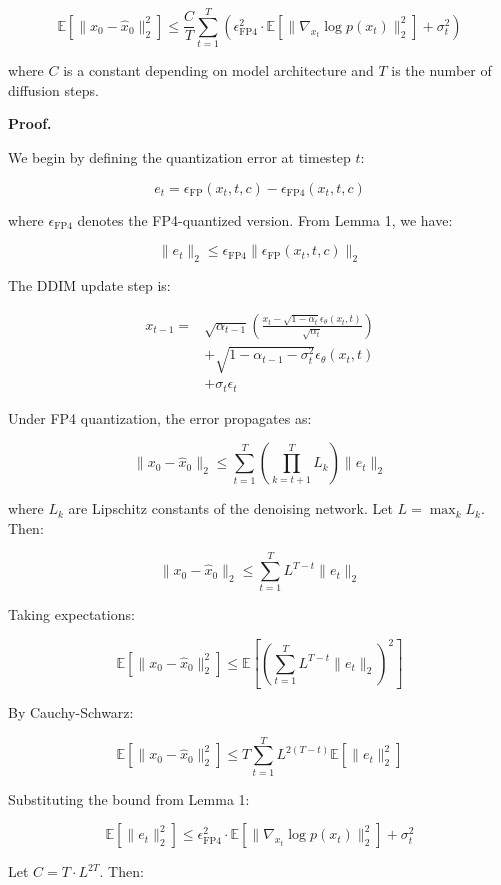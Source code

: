 \documentclass[journal]{IEEEtran}
\theoremstyle{definition}
\theoremstyle{remark}
\newcommand{\EE}{\mathbb{E}}
\begin{document}
\[
\EE[\|x_0 - \hat{x}_0\|_2^2] \leq \frac{C}{T} \sum_{t=1}^T \left( \epsilon_{\text{FP4}}^2 \cdot \EE[\|\nabla_{x_t} \log p(x_t)\|_2^2] + \sigma_t^2 \right)
\]

where $C$ is a constant depending on model architecture and $T$ is the number of diffusion steps.

\textbf{Proof.} 

We begin by defining the quantization error at timestep $t$:

\[
e_t = \epsilon_{\text{FP}}(x_t, t, c) - \epsilon_{\text{FP4}}(x_t, t, c)
\]

where $\epsilon_{\text{FP4}}$ denotes the FP4-quantized version. From Lemma 1, we have:

\[
\|e_t\|_2 \leq \epsilon_{\text{FP4}} \|\epsilon_{\text{FP}}(x_t, t, c)\|_2
\]

The DDIM update step is:

\begin{equation}
\begin{split}
x_{t-1} = &\sqrt{\alpha_{t-1}} \left( \frac{x_t - \sqrt{1-\alpha_t} \epsilon_\theta(x_t, t)}{\sqrt{\alpha_t}} \right) \\
&+ \sqrt{1-\alpha_{t-1} - \sigma_t^2} \epsilon_\theta(x_t, t) \\
&+ \sigma_t \epsilon_t
\end{split}
\end{equation}

Under FP4 quantization, the error propagates as:

\[
\|x_0 - \hat{x}_0\|_2 \leq \sum_{t=1}^T \left( \prod_{k=t+1}^T L_k \right) \|e_t\|_2
\]

where $L_k$ are Lipschitz constants of the denoising network. Let $L = \max_k L_k$. Then:

\[
\|x_0 - \hat{x}_0\|_2 \leq \sum_{t=1}^T L^{T-t} \|e_t\|_2
\]

Taking expectations:

\[
\EE[\|x_0 - \hat{x}_0\|_2^2] \leq \EE\left[\left(\sum_{t=1}^T L^{T-t} \|e_t\|_2\right)^2\right]
\]

By Cauchy-Schwarz:

\[
\EE[\|x_0 - \hat{x}_0\|_2^2] \leq T \sum_{t=1}^T L^{2(T-t)} \EE[\|e_t\|_2^2]
\]

Substituting the bound from Lemma 1:

\[
\EE[\|e_t\|_2^2] \leq \epsilon_{\text{FP4}}^2 \cdot \EE[\|\nabla_{x_t} \log p(x_t)\|_2^2] + \sigma_t^2
\]

Let $C = T \cdot L^{2T}$. Then:
\end{document}
